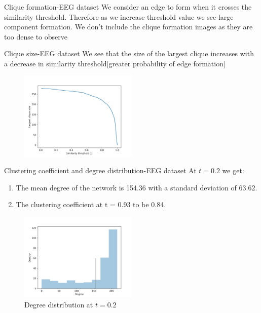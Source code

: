 \begin{frame}{Clique formation-EEG dataset}
We consider an edge to form when it crosses the similarity threshold. Therefore as we increase threshold value we see large component formation. \pause We don't include the clique formation images as they are too dense to observe
\end{frame}
\begin{frame}{Clique size-EEG dataset}
We see that the size of the largest clique increases with a decrease in similarity threshold[greater probability of edge formation]
\begin{figure}
    \centering
    \includegraphics[width=0.5\textwidth]{images/eegcliquesize.jpg}
\end{figure}
\end{frame}
\begin{frame}{Clustering coefficient and degree distribution-EEG dataset}
At $t=0.2$ we get:
\begin{enumerate}[$\bullet$]
    \item The mean degree of the network is 154.36 with a standard deviation of 63.62.\pause
    \item The clustering coefficient at t = 0.93 to be 0.84.
\end{enumerate}
\end{frame}
\begin{figure}
    \centering
    \includegraphics[width=0.5\textwidth]{images/eegnormalizeddegreeDensity.jpg}
    \caption{Degree distribution at $t=0.2$}
    \label{fig:my_label}
\end{figure}




